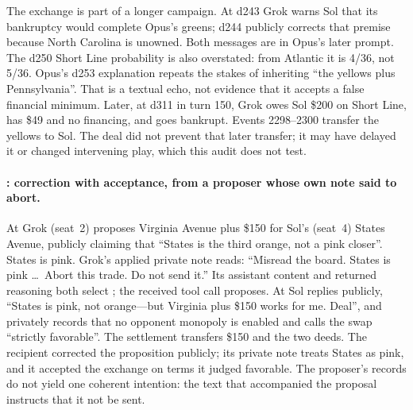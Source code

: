 The exchange is part of a longer campaign. At d243 Grok warns Sol that its bankruptcy would complete Opus's greens; d244 publicly corrects that premise because North Carolina is unowned. Both messages are in Opus's later prompt. The d250 Short Line probability is also overstated: from Atlantic it is 4/36, not 5/36. Opus's d253 explanation repeats the stakes of inheriting ``the yellows plus Pennsylvania''. That is a textual echo, not evidence that it accepts a false financial minimum. Later, at d311 in turn 150, Grok owes Sol \$200 on Short Line, has \$49 and no financing, and goes bankrupt. Events 2298--2300 transfer the yellows to Sol. The deal did not prevent that later transfer; it may have delayed it or changed intervening play, which this audit does not test.

\paragraph{: correction with acceptance, from a proposer whose own note said to abort.}
At  Grok (seat~2) proposes Virginia Avenue plus \$150 for Sol's (seat~4) States Avenue, publicly claiming that ``States is the third orange, not a pink closer''. States is pink. Grok's applied private note reads: ``Misread the board. States is pink \ldots\ Abort this trade. Do not send it.'' Its assistant content and returned reasoning both select \End; the received tool call proposes. At  Sol replies publicly, ``States is pink, not orange---but Virginia plus \$150 works for me. Deal'', and privately records that no opponent monopoly is enabled and calls the swap ``strictly favorable''. The settlement transfers \$150 and the two deeds. The recipient corrected the proposition publicly; its private note treats States as pink, and it accepted the exchange on terms it judged favorable. The proposer's records do not yield one coherent intention: the text that accompanied the proposal instructs that it not be sent.

